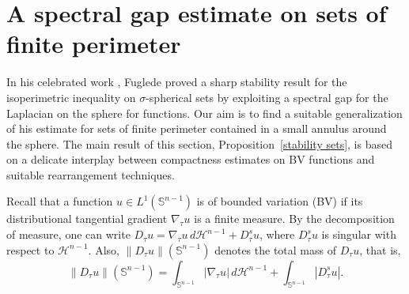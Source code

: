 \documentclass[reqno,11pt]{amsart}
\numberwithin{equation}{section}
\theoremstyle{remark}
\begin{document}
 
 
\section{A spectral gap estimate on sets of finite perimeter}\label{sec:spectral sets FP}
 
In his celebrated work \cite{Fuglede1989}, Fuglede proved a sharp stability result for the isoperimetric inequality on $\sigma$-spherical sets by exploiting a spectral gap for the Laplacian on the sphere for functions.
Our aim is to find a suitable generalization of his estimate for sets of finite perimeter contained in a small annulus around the sphere. The main result of this section, Proposition~\ref{stability sets}, is based on a delicate interplay between compactness estimates on BV functions and suitable rearrangement techniques.


Recall that a function $u\in L^1(\mathbb S^{n-1})$ is of bounded variation (BV) if its distributional tangential gradient $\nabla_\tau u$ is a finite measure.
By the decomposition of measure, one can write $D_\tau u=\nabla_\tau u\,d\mathscr H^{n-1}+D^s_\tau u$, where $D^s_\tau u$ is singular with respect to $\mathscr H^{n-1}$. Also, $\|D_\tau u\|(\mathbb S^{n-1})$ denotes the total mass of $D_\tau u$, that is,
$$
\|D_\tau u\|(\mathbb S^{n-1})=\int_{\mathbb S^{n-1}}|\nabla_\tau u|\,d\mathscr H^{n-1}+\int_{\mathbb S^{n-1}}|D^s_\tau u|.
$$
 
\end{document}
